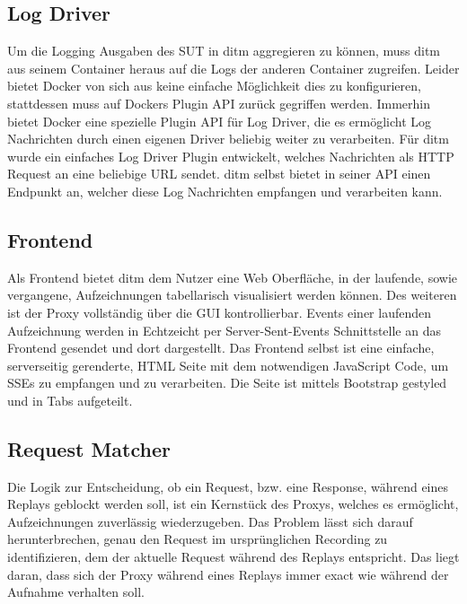 \documentclass[12pt,a4paper]{report}
\begin{document}
\subsection{Log Driver}
Um die Logging Ausgaben des SUT in ditm aggregieren zu können, muss ditm aus seinem Container heraus auf die Logs der
anderen Container zugreifen. Leider bietet Docker von sich aus keine einfache Möglichkeit dies zu konfigurieren,
stattdessen muss auf Dockers Plugin API zurück gegriffen werden. Immerhin bietet Docker eine spezielle Plugin API
für Log Driver, die es ermöglicht Log Nachrichten durch einen eigenen Driver beliebig weiter zu verarbeiten.
Für ditm wurde ein einfaches Log Driver Plugin entwickelt, welches Nachrichten als HTTP Request an eine beliebige URL
sendet. ditm selbst bietet in seiner API einen Endpunkt an, welcher diese Log Nachrichten empfangen und verarbeiten kann.
\subsection{Frontend}
Als Frontend bietet ditm dem Nutzer eine Web Oberfläche, in der laufende, sowie vergangene, Aufzeichnungen
tabellarisch visualisiert werden können. Des weiteren ist der Proxy vollständig über die GUI kontrollierbar.
Events einer laufenden Aufzeichnung werden in Echtzeicht per Server-Sent-Events Schnittstelle an das Frontend
gesendet und dort dargestellt.
Das Frontend selbst ist eine einfache, serverseitig gerenderte, HTML Seite mit dem notwendigen JavaScript Code,
um SSEs zu empfangen und zu verarbeiten. Die Seite ist mittels Bootstrap gestyled und in Tabs aufgeteilt.
\subsection{Request Matcher}
Die Logik zur Entscheidung, ob ein Request, bzw. eine Response, während eines Replays geblockt werden soll,
ist ein Kernstück des Proxys, welches es ermöglicht, Aufzeichnungen zuverlässig wiederzugeben.
Das Problem lässt sich darauf herunterbrechen, genau den Request im ursprünglichen Recording zu identifizieren,
dem der aktuelle Request während des Replays entspricht. Das liegt daran, dass sich der Proxy während eines
Replays immer exact wie während der Aufnahme verhalten soll.
\end{document}
